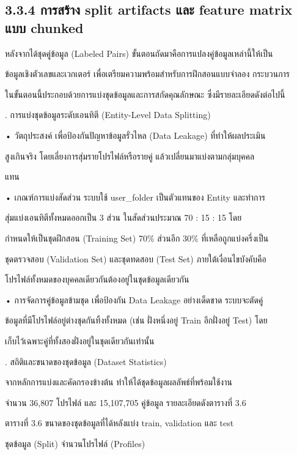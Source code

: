\documentclass[12pt,a4paper]{report}
\begin{document}
\subsection*{3.3.4 การสร้าง split artifacts และ feature matrix แบบ chunked}
หลังจากได้ชุดคู่ข้อมูล (Labeled Pairs) ขั้นตอนถัดมาคือการแปลงคู่ข้อมูลเหล่านี้ให้เป็น\par
ข้อมูลเชิงตัวเลขและเวกเตอร์ เพื่อเตรียมความพร้อมสำหรับการฝึกสอนแบบจำลอง กระบวนการ\par
ในขั้นตอนนี้ประกอบด้วยการแบ่งชุดข้อมูลและการสกัดคุณลักษณะ ซึ่งมีรายละเอียดดังต่อไปนี้\par
{}. การแบ่งชุดข้อมูลระดับเอนทิตี (Entity-Level Data Splitting)\par
\noindent • วัตถุประสงค์ เพื่อป้องกันปัญหาข้อมูลรั่วไหล (Data Leakage) ที่ทำให้ผลประเมิน\par
สูงเกินจริง โดยเลี่ยงการสุ่มรายโปรไฟล์หรือรายคู่ แล้วเปลี่ยนมาแบ่งตามกลุ่มบุคคล\par
แทน\par
\noindent • เกณฑ์การแบ่งสัดส่วน ระบบใช้ user\_folder เป็นตัวแทนของ Entity และทำการ\par
สุ่มแบ่งเอนทิตีทั้งหมดออกเป็น 3 ส่วน ในสัดส่วนประมาณ 70 : 15 : 15 โดย\par
กำหนดให้เป็นชุดฝึกสอน (Training Set) 70\% ส่วนอีก 30\% ที่เหลือถูกแบ่งครึ่งเป็น\par
ชุดตรวจสอบ (Validation Set) และชุดทดสอบ (Test Set) ภายใต้เงื่อนไขบังคับคือ\par
โปรไฟล์ทั้งหมดของบุคคลเดียวกันต้องอยู่ในชุดข้อมูลเดียวกัน\par
\clearpage
\noindent • การจัดการคู่ข้อมูลข้ามชุด เพื่อป้องกัน Data Leakage อย่างเด็ดขาด ระบบจะตัดคู่\par
ข้อมูลที่มีโปรไฟล์อยู่ต่างชุดกันทิ้งทั้งหมด (เช่น ฝั่งหนึ่งอยู่ Train อีกฝั่งอยู่ Test) โดย\par
เก็บไว้เฉพาะคู่ที่ทั้งสองฝั่งอยู่ในชุดเดียวกันเท่านั้น\par
{}. สถิติและขนาดของชุดข้อมูล (Dataset Statistics)\par
จากหลักการแบ่งและคัดกรองข้างต้น ทำให้ได้ชุดข้อมูลผลลัพธ์ที่พร้อมใช้งาน\par
จำนวน 36,807 โปรไฟล์ และ 15,107,705 คู่ข้อมูล รายละเอียดดังตารางที่ 3.6\par
\begin{center}\small ตารางที่ 3.6 ขนาดของชุดข้อมูลที่ได้หลังแบ่ง train, validation และ test\end{center}
ชุดข้อมูล (Split) จำนวนโปรไฟล์ (Profiles)\par
\end{document}
